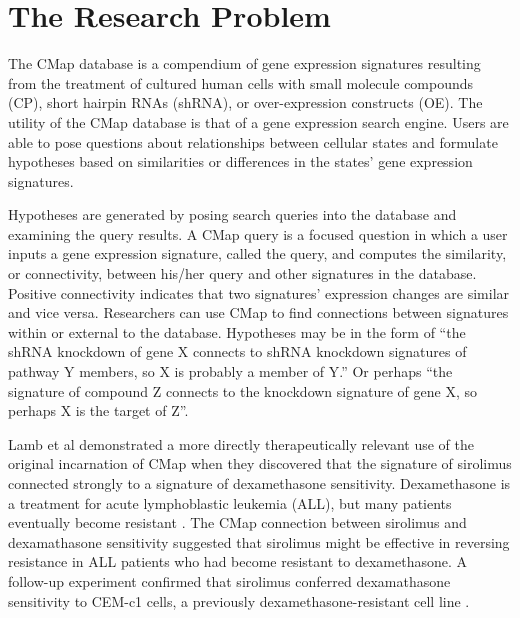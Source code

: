 \documentclass[12pt]{article}
\begin{document}
\doublespacing

\section{The Research Problem}

The CMap database is a compendium of gene expression signatures resulting from the treatment of cultured human cells with small molecule compounds (CP), short hairpin RNAs (shRNA), or over-expression constructs (OE). The utility of the CMap database is that of a gene expression search engine. Users are able to pose questions about relationships between cellular states and formulate hypotheses based on similarities or differences in the states' gene expression signatures.

Hypotheses are generated by posing search queries into the database and examining the query results. A CMap query is a focused question in which a user inputs a gene expression signature, called the query, and computes the similarity, or connectivity, between his/her query and other signatures in the database. Positive connectivity indicates that two signatures' expression changes are similar and vice versa. Researchers can use CMap to find connections between signatures within or external to the database. Hypotheses may be in the form of ``the shRNA knockdown of gene X connects to shRNA knockdown signatures of pathway Y members, so X is probably a member of Y.'' Or perhaps ``the signature of compound Z connects to the knockdown signature of gene X, so perhaps X is the target of Z''.

Lamb et al demonstrated a more directly therapeutically relevant use of the original incarnation of CMap when they discovered that the signature of sirolimus connected strongly to a signature of dexamethasone sensitivity. Dexamethasone is a treatment for acute lymphoblastic leukemia (ALL), but many patients eventually become resistant \cite{tissing_molecular_2003}. The CMap connection between sirolimus and dexamathasone sensitivity suggested that sirolimus might be effective in reversing resistance in ALL patients who had become resistant to dexamethasone. A follow-up experiment confirmed that sirolimus conferred dexamathasone sensitivity to CEM-c1 cells, a previously dexamethasone-resistant cell line \cite{lamb_connectivity_2006}. 
\end{document}
